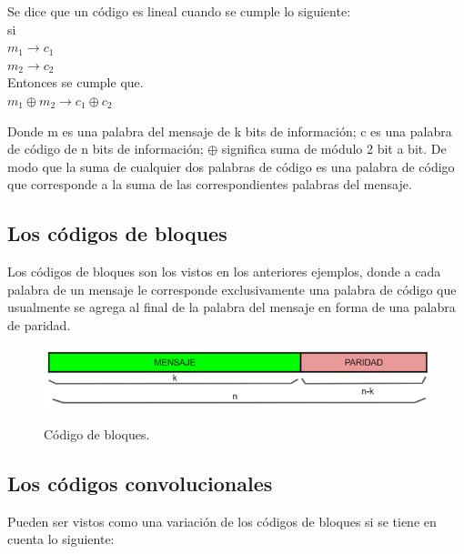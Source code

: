 Se dice que un código es lineal cuando se cumple lo siguiente:\\

si \\
$m_{1} \rightarrow c_{1}$ \\
$m_{2} \rightarrow c_{2}$ \\

Entonces se cumple que.\\
$m_{1} \oplus m_{2} \rightarrow c_{1} \oplus c_{2}$

Donde m es una palabra del mensaje de k bits de información; c es una palabra de código de n bits de información; $\oplus$   significa suma de módulo 2 bit a bit.
De modo que la suma de cualquier dos palabras de código es una palabra de código que corresponde a la suma de las correspondientes palabras del mensaje.

\subsection{Los códigos de bloques}

Los códigos de bloques son los vistos en los anteriores ejemplos, donde a cada palabra de un mensaje le corresponde exclusivamente una palabra de código que usualmente se agrega al final de la palabra del mensaje en forma de una palabra de paridad.

\begin{figure}[h!]
	\captionsetup{justification = raggedright, singlelinecheck = false}
	\caption{Código de bloques.} 
	\centering
	\includegraphics[scale=1]{Imagenes/Paridad.png}
	\label{fig:Paridad}
\end{figure}

\subsection{Los códigos convolucionales}

Pueden ser vistos como una variación de los códigos de bloques si se tiene en cuenta lo siguiente:

